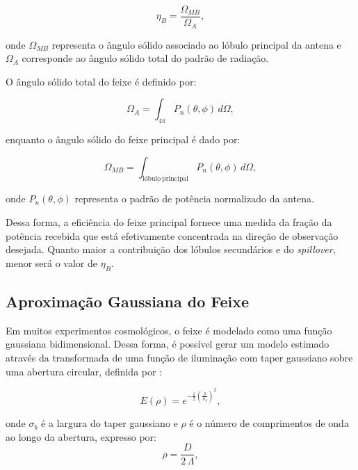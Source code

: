 \begin{equation}
\eta_B=
\frac{\Omega_{MB}}
{\Omega_A},
\end{equation}

onde $\Omega_{MB}$ representa o ângulo sólido associado ao lóbulo principal da antena e $\Omega_A$ corresponde ao ângulo sólido total do padrão de radiação.

O ângulo sólido total do feixe é definido por:

\begin{equation}
\Omega_A
=
\int_{4\pi}
P_n(\theta,\phi)\,d\Omega,
\label{eq:solid_angle_total}
\end{equation}

enquanto o ângulo sólido do feixe principal é dado por:

\begin{equation}
\Omega_{MB}
=\int_{\mathrm{lóbulo\ principal}}
P_n(\theta,\phi)\,d\Omega,
\label{eq:solid_angle_main_beam}
\end{equation}

onde $P_n(\theta,\phi)$ representa o padrão de potência normalizado da antena.

Dessa forma, a eficiência do feixe principal fornece uma medida da fração da potência recebida que está efetivamente concentrada na direção de observação desejada. Quanto maior a contribuição dos lóbulos secundários e do \textit{spillover}, menor será o valor de \(\eta_B\).

\subsection{Aproximação Gaussiana do Feixe}

Em muitos experimentos cosmológicos, o feixe é modelado como uma função gaussiana bidimensional. Dessa forma, é possível gerar um modelo estimado através da transformada de uma função de iluminação com taper gaussiano sobre uma abertura circular, definida por \cite{harper2018potential}:

\begin{equation}
E(\rho) = e^{-\frac{1}{2}\left(\frac{\rho}{\sigma_b}\right)^2},
\end{equation}

onde \(\sigma_b\) é a largura do taper gaussiano e \(\rho\) é o número de comprimentos de onda ao longo da abertura, expresso por:
\begin{equation}
\rho = \frac{D}{2 \,\Lambda},
\end{equation}

